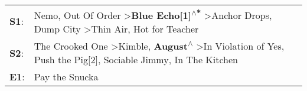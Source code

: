 \begin{supertabular}{p{0.03\textwidth}p{0.92\textwidth}}
 \textbf{S1}:  &      Nemo\textsuperscript{}, \enspace Out Of Order\textsuperscript{} \textgreater \enspace \textbf{Blue Echo[1]\textsuperscript{$\wedge$*}} \textgreater \enspace Anchor Drops\textsuperscript{}, \enspace Dump City\textsuperscript{} \textgreater \enspace Thin Air\textsuperscript{}, \enspace Hot for Teacher\textsuperscript{}  \enspace  \\
 \textbf{S2}:  &  The Crooked One\textsuperscript{} \textgreater \enspace Kimble\textsuperscript{}, \enspace \textbf{August\textsuperscript{$\wedge$}} \textgreater \enspace In Violation of Yes\textsuperscript{}, \enspace Push the Pig[2]\textsuperscript{}, \enspace Sociable Jimmy\textsuperscript{}, \enspace In The Kitchen\textsuperscript{}  \enspace  \\
 \textbf{E1}:  &                                                                                                                                                                                                                                                                                                    Pay the Snucka\textsuperscript{}  \enspace  \\
\end{supertabular}
